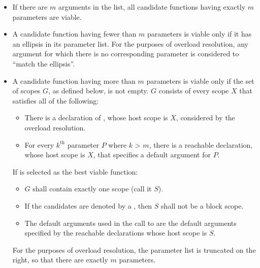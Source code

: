\begin{itemize}
\item
If there are $m$ arguments in the list,
all candidate functions having exactly $m$ parameters are viable.
\item
A candidate function having fewer than $m$ parameters is viable
only if it has an ellipsis in its parameter list.
For the purposes of overload resolution,
any argument for which there is no corresponding parameter is
considered to ``match the ellipsis''.
\item
A candidate function  having more than $m$ parameters is viable
only if the set of scopes $G$, as defined below, is not empty.
$G$ consists of every scope $X$ that satisfies all of the following:
\begin{itemize}
\item There is a declaration of , whose host scope is $X$,
considered by the overload resolution.
\item For every $k^\textrm{th}$ parameter $P$ where $k$ > $m$,
there is a reachable declaration, whose host scope is $X$,
that specifies a default argument for $P$.
\end{itemize}
If  is selected as the best viable function:
\begin{itemize}
\item
$G$ shall contain exactly one scope (call it $S$).
\item
If the candidates are denoted by a ,
then $S$ shall not be a block scope.
\item
The default arguments used in the call to  are
the default arguments specified by
the reachable declarations whose host scope is $S$.
\end{itemize}
For the purposes of overload resolution,
the parameter list is truncated on the right,
so that there are exactly $m$ parameters.
\end{itemize}
